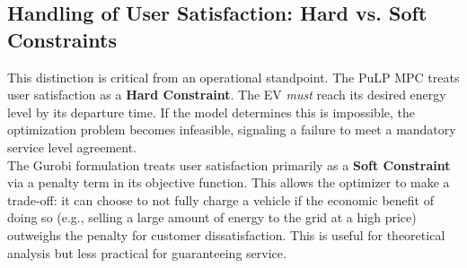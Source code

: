 \subsection{Handling of User Satisfaction: Hard vs. Soft Constraints}
This distinction is critical from an operational standpoint. The PuLP MPC treats user satisfaction as a \textbf{Hard Constraint}. The EV \textit{must} reach its desired energy level by its departure time. If the model determines this is impossible, the optimization problem becomes infeasible, signaling a failure to meet a mandatory service level agreement.
\\
The Gurobi formulation treats user satisfaction primarily as a \textbf{Soft Constraint} via a penalty term in its objective function. This allows the optimizer to make a trade-off: it can choose to not fully charge a vehicle if the economic benefit of doing so (e.g., selling a large amount of energy to the grid at a high price) outweighs the penalty for customer dissatisfaction. This is useful for theoretical analysis but less practical for guaranteeing service.